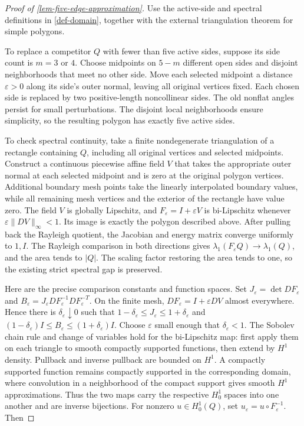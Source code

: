 \documentclass[11pt,a4paper]{article}
\theoremstyle{proofmanuscript}
\begin{document}
\begin{proof}[Proof of \ref{lem-five-edge-approximation}]

Use the active-side and spectral definitions in \ref{def-domain}, together with the external triangulation theorem for simple polygons.

To replace a competitor \(Q\) with fewer than five active sides, suppose its side count is \(m=3\) or \(4\). Choose midpoints on \(5-m\) different open sides and disjoint neighborhoods that meet no other side. Move each selected midpoint a distance \(\varepsilon>0\) along its side's outer normal, leaving all original vertices fixed. Each chosen side is replaced by two positive-length noncollinear sides. The old nonflat angles persist for small perturbations. The disjoint local neighborhoods ensure simplicity, so the resulting polygon has exactly five active sides.

To check spectral continuity, take a finite nondegenerate triangulation of a rectangle containing \(Q\), including all original vertices and selected midpoints. Construct a continuous piecewise affine field \(V\) that takes the appropriate outer normal at each selected midpoint and is zero at the original polygon vertices. Additional boundary mesh points take the linearly interpolated boundary values, while all remaining mesh vertices and the exterior of the rectangle have value zero. The field \(V\) is globally Lipschitz, and \(F_\varepsilon=I+\varepsilon V\) is bi-Lipschitz whenever \(\varepsilon\|DV\|_\infty<1\). Its image is exactly the polygon described above. After pulling back the Rayleigh quotient, the Jacobian and energy matrix converge uniformly to \(1,I\). The Rayleigh comparison in both directions gives \(\lambda_1(F_\varepsilon Q)\to\lambda_1(Q)\), and the area tends to \(|Q|\). The scaling factor restoring the area tends to one, so the existing strict spectral gap is preserved.

Here are the precise comparison constants and function spaces. Set \(J_\varepsilon=\det DF_\varepsilon\) and \(B_\varepsilon=J_\varepsilon DF_\varepsilon^{-1}DF_\varepsilon^{-T}\). On the finite mesh, \(DF_\varepsilon=I+\varepsilon DV\) almost everywhere. Hence there is \(\delta_\varepsilon\downarrow0\) such that \(1-\delta_\varepsilon\le J_\varepsilon\le1+\delta_\varepsilon\) and \((1-\delta_\varepsilon)I\le B_\varepsilon\le(1+\delta_\varepsilon)I\). Choose \(\varepsilon\) small enough that \(\delta_\varepsilon<1\). The Sobolev chain rule and change of variables hold for the bi-Lipschitz map: first apply them on each triangle to smooth compactly supported functions, then extend by \(H^1\) density. Pullback and inverse pullback are bounded on \(H^1\). A compactly supported function remains compactly supported in the corresponding domain, where convolution in a neighborhood of the compact support gives smooth \(H^1\) approximations. Thus the two maps carry the respective \(H_0^1\) spaces into one another and are inverse bijections. For nonzero \(u\in H_0^1(Q)\), set \(u_\varepsilon=u\circ F_\varepsilon^{-1}\). Then


\end{proof}
\end{document}
